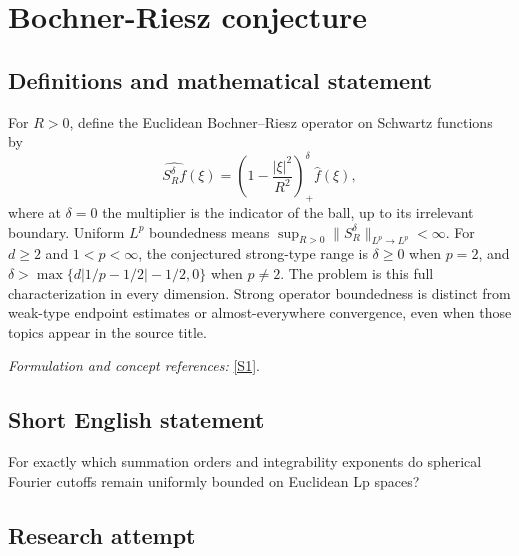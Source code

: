 \documentclass[11pt,a4paper]{article}
\newcommand{\sref}[2]{\hyperlink{source:#1:#2}{[S#2]}}
\newif\ifshowcatalogue
\newcommand{\cataloguescope}[1]{\ifshowcatalogue
 \paragraph{Exact scope in the supplied catalogue.}
 \begin{quote}\small #1\end{quote}\fi}
\numberwithin{equation}{section}
\begin{document}
\setcounter{section}{0}
\clearpage
\section*{\texorpdfstring{Bochner-Riesz conjecture}{Bochner-Riesz conjecture}}\label{statement}
\subsection{Definitions and mathematical statement}
For $R>0$, define the Euclidean Bochner--Riesz operator on Schwartz functions by
\[
 \widehat{S_R^\delta f}(\xi)=\left(1-\frac{|\xi|^2}{R^2}\right)_+^\delta\widehat f(\xi),
\]
where at $\delta=0$ the multiplier is the indicator of the ball, up to its irrelevant boundary. Uniform $L^p$ boundedness means
$\sup_{R>0}\|S_R^\delta\|_{L^p\to L^p}<\infty$.
For $d\ge2$ and $1<p<\infty$, the conjectured strong-type range is $\delta\ge0$ when $p=2$, and
$\delta>\max\{d|1/p-1/2|-1/2,0\}$ when $p\ne2$.
The problem is this full characterization in every dimension. Strong operator boundedness is distinct from weak-type endpoint estimates or almost-everywhere convergence, even when those topics appear in the source title.
\par\smallskip\textit{Formulation and concept references:} \sref{statement}{1}.
\cataloguescope{Prove the sharp conjectured characterization of all orders delta greater than or equal to zero and exponents 1<p<infinity for which the Euclidean Bochner-Riesz means are uniformly bounded on L\textasciicircum{}p(R\textasciicircum{}d), in every dimension d at least 2.}
\subsection{Short English statement}
For exactly which summation orders and integrability exponents do spherical Fourier cutoffs remain uniformly bounded on Euclidean Lp spaces?
\subsection{Research attempt}
\end{document}
